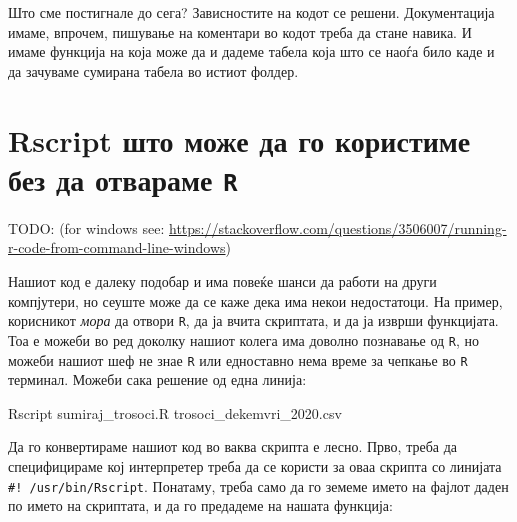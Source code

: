 \documentclass[
]{book}
\newenvironment{Shaded}{\begin{snugshade}}{\end{snugshade}}
\newcommand{\ExtensionTok}[1]{#1}
\newcommand{\NormalTok}[1]{#1}
\begin{document}
Што сме постигнале до сега? Зависностите на кодот се решени. Документација имаме, впрочем, пишување на коментари во кодот треба да стане навика. И имаме функција на која може да и дадеме табела која што се наоѓа било каде и да зачуваме сумирана табела во истиот фолдер.

\hypertarget{rscript-ux448ux442ux43e-ux43cux43eux436ux435-ux434ux430-ux433ux43e-ux43aux43eux440ux438ux441ux442ux438ux43cux435-ux431ux435ux437-ux434ux430-ux43eux442ux432ux430ux440ux430ux43cux435-r}{%
\section{\texorpdfstring{Rscript што може да го користиме без да отвараме \texttt{R}}{Rscript што може да го користиме без да отвараме R}}\label{rscript-ux448ux442ux43e-ux43cux43eux436ux435-ux434ux430-ux433ux43e-ux43aux43eux440ux438ux441ux442ux438ux43cux435-ux431ux435ux437-ux434ux430-ux43eux442ux432ux430ux440ux430ux43cux435-r}}

TODO:
(for windows see: \url{https://stackoverflow.com/questions/3506007/running-r-code-from-command-line-windows})

Нашиот код е далеку подобар и има повеќе шанси да работи на други компјутери, но сеуште може да се каже дека има некои недостатоци. На пример, корисникот \emph{мора} да отвори \texttt{R}, да ја вчита скриптата, и да ја изврши функцијата. Тоа е можеби во ред доколку нашиот колега има доволно познавање од \texttt{R}, но можеби нашиот шеф не знае \texttt{R} или едноставно нема време за чепкање во \texttt{R} терминал. Можеби сака решение од една линија:

\begin{Shaded}
\begin{Highlighting}[]
\ExtensionTok{Rscript}\NormalTok{ sumiraj\_trosoci.R trosoci\_dekemvri\_2020.csv}
\end{Highlighting}
\end{Shaded}

Да го конвертираме нашиот код во ваква скрипта е лесно. Прво, треба да специфицираме кој интерпретер треба да се користи за оваа скрипта со линијата \texttt{\#!\ /usr/bin/Rscript}. Понатаму, треба само да го земеме името на фајлот даден по името на скриптата, и да го предадеме на нашата функција:
\end{document}
